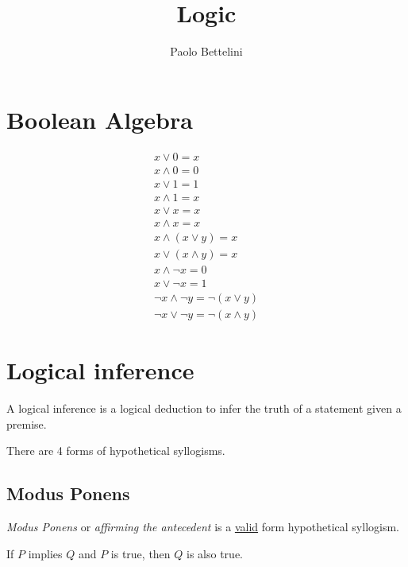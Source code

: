 \documentclass[a4paper]{article}
\title{Logic}
\author{Paolo Bettelini}
\date{}
\begin{document}
\maketitle
\tableofcontents
\pagebreak

\section{Boolean Algebra}


\begin{align*}
    x \lor 0 = x \\
    x \land 0 = 0 \\
    x \lor 1 = 1 \\
    x \land 1 = x \\
    x \lor x = x \\
    x \land x = x \\
    x \land (x \lor y) = x \\
    x \lor (x \land y) = x \\
    x \land \lnot x = 0 \\
    x \lor \lnot x = 1 \\
    \lnot x \land \lnot y = \lnot (x \lor y) \\
    \lnot x \lor \lnot y = \lnot (x \land y)
\end{align*}

\pagebreak

\section{Logical inference}

A logical inference is a logical deduction to infer the truth
of a statement given a premise.

There are 4 forms of hypothetical syllogisms.

\subsection{Modus Ponens}

\textit{Modus Ponens} or \textit{affirming the antecedent}
is a \underline{valid} form hypothetical syllogism.

\begin{prooftree}
\end{prooftree}
If \(P\) implies \(Q\) and \(P\) is true, then \(Q\) is also true.
\end{document}
